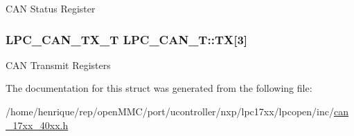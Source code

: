 C\-A\-N Status Register \hypertarget{structLPC__CAN__T_ad24f43de6447283b4379922cc1c83a1d}{
\subsubsection[{T\-X}]{ {\bf L\-P\-C\-\_\-\-C\-A\-N\-\_\-\-T\-X\-\_\-\-T} L\-P\-C\-\_\-\-C\-A\-N\-\_\-\-T\-::\-T\-X\mbox{[}3\mbox{]}}}\label{structLPC__CAN__T_ad24f43de6447283b4379922cc1c83a1d}
C\-A\-N Transmit Registers 

The documentation for this struct was generated from the following file\-:\begin{DoxyCompactItemize}
\item 
/home/henrique/rep/open\-M\-M\-C/port/ucontroller/nxp/lpc17xx/lpcopen/inc/\hyperlink{can__17xx__40xx_8h}{can\-\_\-17xx\-\_\-40xx.\-h}\end{DoxyCompactItemize}
